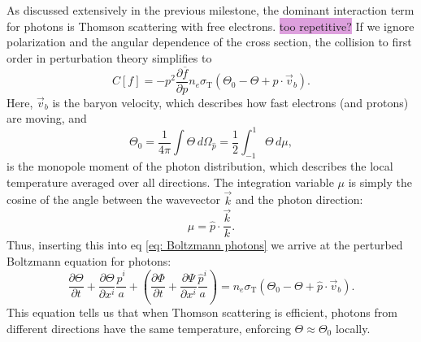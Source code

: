 \documentclass{aa}
\numberwithin{equation}{section}
\numberwithin{table}{section}
\numberwithin{figure}{section}
\begin{document}
As discussed extensively in the previous milestone, the dominant interaction term for photons is Thomson scattering with free electrons. \colorbox{Plum}{too repetitive?} If we ignore polarization and the angular dependence of the cross section, the collision to first order in perturbation theory simplifies to
\begin{equation}
  C[f] = -p^2\frac{\partial\overline{f}}{\partial p}n_e\sigma_\text{T}\left(\Theta_0 - \Theta + \hat{p}\cdot\vec{v}_b \right). \label{eq: collision photons}
\end{equation}
Here, $\vec{v}_b$ is the baryon velocity, which describes how fast electrons (and protons) are moving, and
\begin{equation}
  \Theta_0 = \frac{1}{4\pi}\int\Theta\,d\Omega_{\hat{p}} = \frac{1}{2}\int_{-1}^{1}\Theta\,d\mu, 
\end{equation}
is the monopole moment of the photon distribution, which describes the local temperature averaged over all directions. The integration variable $\mu$ is simply the cosine of the angle between the wavevector $\vec{k}$ and the photon direction:
\begin{equation}
  \mu = \hat{p}\cdot\frac{\vec{k}}{k}.
\end{equation}
Thus, inserting this into eq \eqref{eq: Boltzmann photons} we arrive at the perturbed Boltzmann equation for photons:
\begin{equation}
  \frac{\partial{\Theta}}{\partial t} + \frac{\partial{\Theta}}{\partial x^{i}}\frac{\hat{p}^{i}}{a} + \left(\frac{\partial{\Phi}}{\partial t} + \frac{\partial{\Psi}}{\partial x^{i}}\frac{\hat{p}^{i}}{a} \right) = n_e\sigma_\text{T}\left(\Theta_0 - \Theta + \hat{p}\cdot\vec{v}_b \right).
\end{equation}
This equation tells us that when Thomson scattering is efficient, photons from different directions have the same temperature, enforcing $\Theta\approx\Theta_0$ locally.
\end{document}
